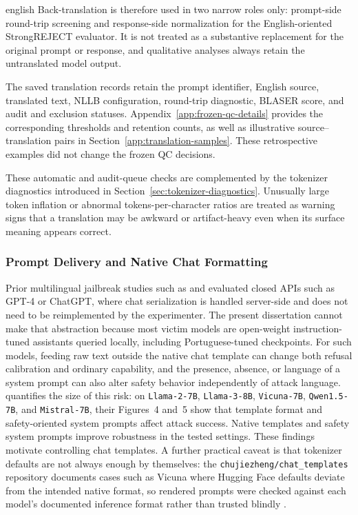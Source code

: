 \begin{otherlanguage*}{english}
Back-translation is therefore used in two narrow roles only: prompt-side round-trip screening and response-side normalization for the English-oriented StrongREJECT evaluator. It is not treated as a substantive replacement for the original prompt or response, and qualitative analyses always retain the untranslated model output.

The saved translation records retain the prompt identifier, English source, translated text, NLLB configuration, round-trip diagnostic, BLASER score, and audit and exclusion statuses. Appendix~\ref{app:frozen-qc-details} provides the corresponding thresholds and retention counts, as well as illustrative source--translation pairs in Section~\ref{app:translation-samples}. These retrospective examples did not change the frozen QC decisions.

These automatic and audit-queue checks are complemented by the tokenizer diagnostics introduced in Section~\ref{sec:tokenizer-diagnostics}. Unusually large token inflation or abnormal tokens-per-character ratios are treated as warning signs that a translation may be awkward or artifact-heavy even when its surface meaning appears correct.

\subsubsection{Prompt Delivery and Native Chat Formatting}
\label{sec:prompt-formatting-policy}

Prior multilingual jailbreak studies such as \textcite{yongLowResourceLanguagesJailbreak2023} and \textcite{dengMultilingualJailbreakChallenges2024} evaluated closed APIs such as GPT-4 or ChatGPT, where chat serialization is handled server-side and does not need to be reimplemented by the experimenter. The present dissertation cannot make that abstraction because most victim models are open-weight instruction-tuned assistants queried locally, including Portuguese-tuned checkpoints. For such models, feeding raw text outside the native chat template can change both refusal calibration and ordinary capability, and the presence, absence, or language of a system prompt can also alter safety behavior independently of attack language. \textcite{xuBagTricksBenchmarking2024} quantifies the size of this risk: on \texttt{Llama-2-7B}, \texttt{Llama-3-8B}, \texttt{Vicuna-7B}, \texttt{Qwen1.5-7B}, and \texttt{Mistral-7B}, their Figures~4 and~5 show that template format and safety-oriented system prompts affect attack success. Native templates and safety system prompts improve robustness in the tested settings. These findings motivate controlling chat templates. A further practical caveat is that tokenizer defaults are not always enough by themselves: the \texttt{chujiezheng/chat\_templates} repository documents cases such as Vicuna where Hugging Face defaults deviate from the intended native format, so rendered prompts were checked against each model's documented inference format rather than trusted blindly \cite{zhengChatTemplates2024}.


\end{otherlanguage*}
